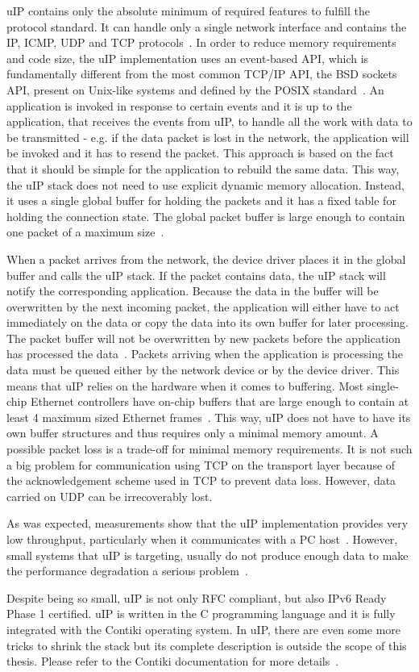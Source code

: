 uIP contains only the absolute minimum of required features to fulfill the protocol standard.
It can handle only a single network interface and contains the IP, ICMP, UDP and TCP protocols~\cite{contiki-docs}.
In order to reduce memory requirements and code size,
the uIP implementation uses an event-based API, which is fundamentally different
from the most common TCP/IP API, the BSD sockets API, present on Unix-like systems
and defined by the POSIX standard~\cite{thesis-programming,posix}.
An application is invoked in response to certain events and
it is up to the application, that receives the events from uIP, to handle all the
work with data to be transmitted - e.g. if the data packet is lost in the network,
the application will be invoked and it has to resend the packet.
This approach is based on the fact that it should be simple for the application
to rebuild the same data.
This way, the uIP stack does not need to use explicit dynamic memory allocation.
Instead, it uses a single global buffer for holding the packets and it has a fixed
table for holding the connection state.
The global packet buffer is large enough to contain one packet of a maximum size~\cite{contiki-docs}.

When a packet arrives from the network, the device driver places it in the
global buffer and calls the uIP stack.
If the packet contains data, the uIP stack will notify the corresponding application.
Because the data in the buffer will be overwritten by the next incoming packet,
the application will either have to act immediately on the data or copy the data into
its own buffer for later processing.
The packet buffer will not be overwritten by new packets before the application has processed the data~\cite{contiki-docs}.
Packets arriving when the application is processing the data must be queued
either by the network device or by the device driver.
This means that uIP relies on the hardware when it comes to buffering.
Most single-chip Ethernet controllers have on-chip buffers
that are large enough to contain at least 4 maximum sized Ethernet frames~\cite{contiki-docs}.
This way, uIP does not have to have its own buffer structures and thus requires only a minimal memory amount.
A possible packet loss is a trade-off for minimal memory requirements.
It is not such a big problem for communication using TCP on the transport layer
because of the acknowledgement scheme used in TCP to prevent data loss.
However, data carried on UDP can be irrecoverably lost.

As was expected, measurements show that the uIP implementation provides very low
throughput, particularly when it communicates with a PC host~\cite{thesis-towards}.
However, small systems that uIP is targeting, usually do not produce enough data
to make the performance degradation a serious problem~\cite{thesis-towards}.

Despite being so small, uIP is not only RFC compliant, but also IPv6 Ready Phase 1 certified.
uIP is written in the C programming language and it is fully integrated with the Contiki operating system.
In uIP, there are even some more tricks to shrink the stack
but its complete description is outside the scope of this thesis.
Please refer to the Contiki documentation for more details~\cite{contiki-docs}.

